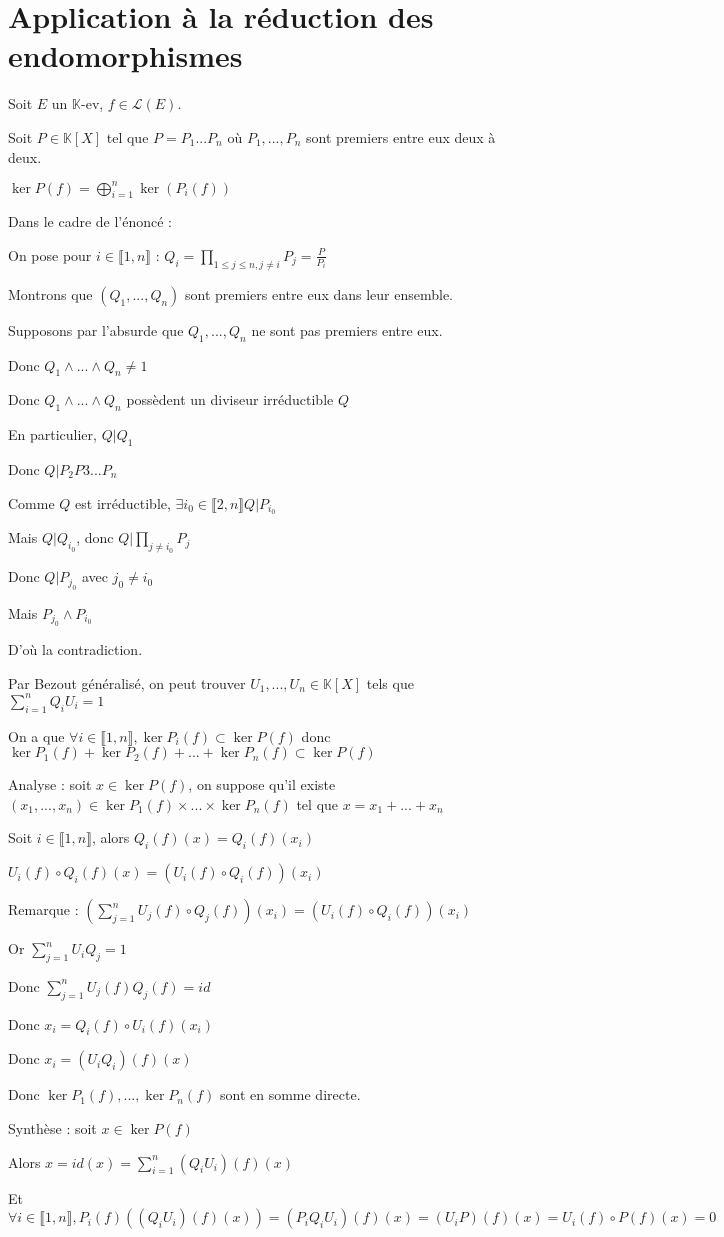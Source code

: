 \documentclass[a4paper,12pt]{book}
\newcommand{\Thr}[2]{\begin{tcolorbox}[sharp corners, colback=white,colframe=red!90!black!75, title=Théorème : #1]#2\end{tcolorbox}}
\newcommand{\Pre}[1]{\begin{tcolorbox}[sharp corners, colback=white,colframe=green!60!green!30!black!75, title=Preuve]#1\end{tcolorbox}}
\def\K{\mathbb{K}}
\begin{document}
\section{Application à la réduction des endomorphismes}
\Thr{Lemme des noyaux}{Soit $E$ un $\K$-ev, $f\in \mathcal{L}(E)$. \par Soit $P\in \K[X]$ tel que $P=P_1...P_n$ où $P_1,...,P_n$ sont premiers entre eux deux à deux. \par $\ker P(f) = \bigoplus\limits_{i=1}^n\ker(P_i(f))$}
\Pre{Dans le cadre de l'énoncé : \par On pose pour $i\in\llbracket 1,n\rrbracket$ : $Q_i = \prod\limits_{1\leq j\leq n, j\neq i} P_j = \frac{P}{P_i}$ \par Montrons que $(Q_1,..., Q_n)$ sont premiers entre eux dans leur ensemble. \par Supposons par l'absurde que $Q_1,...,Q_n$ ne sont pas premiers entre eux. \par Donc $Q_1\wedge...\wedge Q_n \neq 1$ \par Donc $Q_1\wedge...\wedge Q_n$ possèdent un diviseur irréductible $Q$ \par En particulier, $Q\vert Q_1$ \par Donc $Q\vert P_2P3...P_n$
\par Comme $Q$ est irréductible, $\exists i_0\in \llbracket 2,n\rrbracket Q\vert P_{i_0}$ \par Mais $Q\vert Q_{i_0}$, donc $Q\vert \prod\limits_{j\neq i_0}P_j$ \par Donc $Q\vert P_{j_0}$ avec $j_0\neq i_0$ \par Mais $P_{j_0}\wedge P_{i_0}$ \par D'où la contradiction.
\par Par Bezout généralisé, on peut trouver $U_1,...,U_n\in\K[X]$ tels que $\sum\limits_{i=1}^nQ_iU_i=1$ \par On a que $\forall i\in\llbracket 1,n\rrbracket, \ker P_i(f) \subset\ker P(f)$ donc $\ker P_1(f)+\ker P_2(f)+...+\ker P_n(f)\subset \ker P(f)$ \par Analyse : soit $x\in \ker P(f)$, on suppose qu'il existe $(x_1,...,x_n)\in \ker P_1(f)\times...\times\ker P_n(f)$ tel que $x=x_1+...+x_n$ \par Soit $i\in \llbracket 1,n\rrbracket$, alors $Q_i(f)(x)=Q_i(f)(x_i)$ \par $U_i(f)\circ Q_i(f)(x) = (U_i(f)\circ Q_i(f))(x_i)$
\par Remarque : $\left(\sum\limits_{j=1}^nU_j(f)\circ Q_j(f)\right)(x_i) = (U_i(f)\circ Q_i(f))(x_i)$ \par Or $\sum\limits_{j=1}^nU_iQ_j=1$ \par Donc $\sum\limits_{j=1}^nU_j(f)Q_j(f)=id$ \par Donc $x_i = Q_i(f)\circ U_i(f)(x_i)$ \par Donc $x_i = (U_iQ_i)(f)(x)$ \par Donc $\ker P_1(f),..., \ker P_n(f)$ sont en somme directe.
\par Synthèse : soit $x\in \ker P(f)$ \par Alors $x = id(x) = \sum\limits_{i=1}^n(Q_iU_i)(f)(x)$ \par Et $\forall i\in\llbracket1,n\rrbracket, P_i(f)((Q_iU_i)(f)(x)) = (P_iQ_iU_i)(f)(x)=(U_iP)(f)(x)= U_i(f)\circ P(f)(x)=0$}
\end{document}
